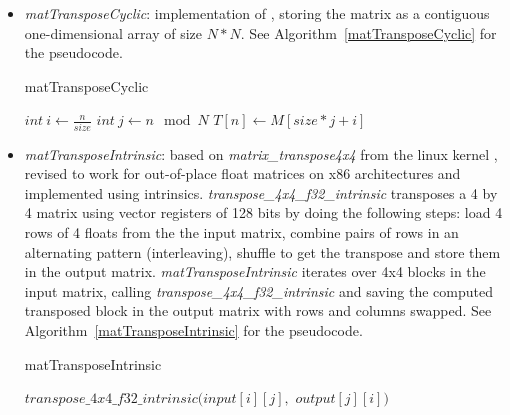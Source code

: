 \documentclass[conference]{IEEEtran}
\begin{document}
\begin{itemize}
\item \textit{matTransposeCyclic}: implementation of \cite{b13}, storing the matrix as a contiguous one-dimensional array of size $N*N$. See Algorithm~\ref{matTransposeCyclic} for the pseudocode.
  \begin{algorithm}
  	\caption{matTransposeCyclic}\label{matTransposeCyclic}
  \begin{algorithmic}[1]

        \State $int\ \textit{i} \gets \frac{n}{size}$
        \State $int\ \textit{j} \gets n \mod N$
        \State $T[n] \gets M[size * j + i]$
        \EndFor
          \end{algorithmic}
  \end{algorithm}

\item \textit{matTransposeIntrinsic}: based on \textit{matrix\_transpose4x4} from the linux kernel \cite{b16}, revised to work for out-of-place float matrices on x86 architectures and implemented using intrinsics. \textit{transpose\_4x4\_f32\_intrinsic} transposes a 4 by 4 matrix using vector registers of 128 bits by doing the following steps: load 4 rows of 4 floats from the the input matrix, combine pairs of rows in an alternating pattern (interleaving), shuffle to get the transpose and store them in the output matrix. \textit{matTransposeIntrinsic} iterates over 4x4 blocks in the input matrix, calling \textit{transpose\_4x4\_f32\_intrinsic} and saving the computed transposed block in the output matrix with rows and columns swapped. See Algorithm~\ref{matTransposeIntrinsic} for the pseudocode.
  \begin{algorithm}
	\caption{matTransposeIntrinsic}\label{matTransposeIntrinsic}
	    \begin{algorithmic}[1]
	\iffalse

      \Procedure{transpose\_4x4\_f32\_intrinsic}{Matrix4x4 in, Matrix4x4 out}
    \State \textbf{comment} Load rows  
    \State \textbf{comment} unpack and interleave rows
    \State \textbf{comment} Shuffle to form transposed rows
    \State \textbf{comment} Store transposed rows
      \EndProcedure
      
      \fi

        \State $transpose\_4x4\_f32\_intrinsic(input[i][j],$
        \State $                               output[j][i])$
        \EndFor
        \EndFor


\end{algorithmic}
\end{algorithm}
\end{itemize}
\end{document}
